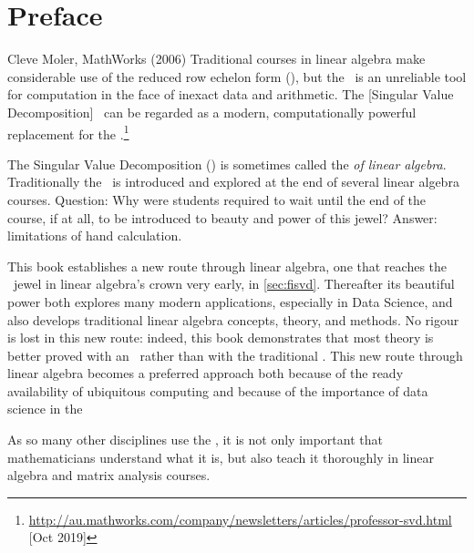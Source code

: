 \tableofcontents


\chapter*{Preface}


\begin{quoted}{Cleve Moler, MathWorks (2006)}
Traditional courses in linear algebra make considerable use of the 
{reduced row echelon form} (\rref), but the \rref\ is an unreliable tool for computation in the face of inexact data and arithmetic. 
The [Singular Value Decomposition] \svd\ can be regarded as a modern, computationally powerful replacement for the \rref.\footnote{\url{http://au.mathworks.com/company/newsletters/articles/professor-svd.html} [Oct 2019]}
\end{quoted}

The Singular Value Decomposition (\svd) is sometimes called the \emph{ of linear algebra}.
Traditionally the \svd\ is introduced and explored at the end of several linear algebra courses.
Question: Why were students required to wait until the end of the course, if at all, to be introduced to beauty and power of this jewel?
Answer: limitations of hand calculation.

This book establishes a new route through linear algebra, one that reaches the \svd\ jewel in linear algebra's crown very early, in \cref{sec:fisvd}.
Thereafter its beautiful power both explores many modern applications, especially in Data Science, and also develops traditional linear algebra concepts, theory, and methods.
No rigour is lost in this new route: indeed, this book demonstrates that most theory is better proved with an \svd\ rather than with the traditional \rref.
This new route through linear algebra becomes a preferred approach both because of the ready availability of ubiquitous computing and because of the importance of data science in the 


\begin{quoted}{\cite{Turner2014}}%
As so many other disciplines use the \svd, it is not only important that mathematicians understand what it is, but also teach it thoroughly in linear algebra and matrix analysis courses.
\end{quoted}











